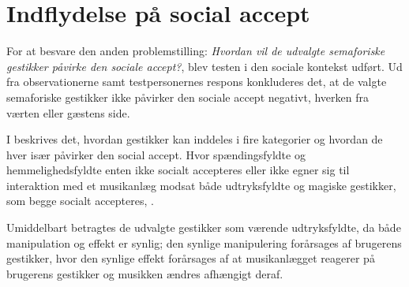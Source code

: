 \section{Indflydelse på social accept}
\label{DiskussionSocialAccept}
%
For at besvare den anden problemstilling: \textit{Hvordan vil de udvalgte semaforiske gestikker påvirke den sociale accept?}, blev testen i den sociale kontekst udført. Ud fra observationerne samt testpersonernes respons konkluderes det, at de valgte semaforiske gestikker ikke påvirker den sociale accept negativt, hverken fra værten eller gæstens side.
 
I  beskrives det, hvordan gestikker kan inddeles i fire kategorier og hvordan de hver især påvirker den social accept. Hvor spændingsfyldte og hemmelighedsfyldte enten ikke socialt accepteres eller ikke egner sig til interaktion med et musikanlæg modsat både udtryksfyldte og magiske gestikker, som begge socialt accepteres, \parencite[s. 276]{PDF:WouldYouDoThat}. 

Umiddelbart betragtes de udvalgte gestikker som værende udtryksfyldte, da både manipulation og effekt er synlig; den synlige manipulering forårsages af brugerens gestikker, hvor den synlige effekt forårsages af at musikanlægget reagerer på brugerens gestikker og musikken ændres afhængigt deraf.

